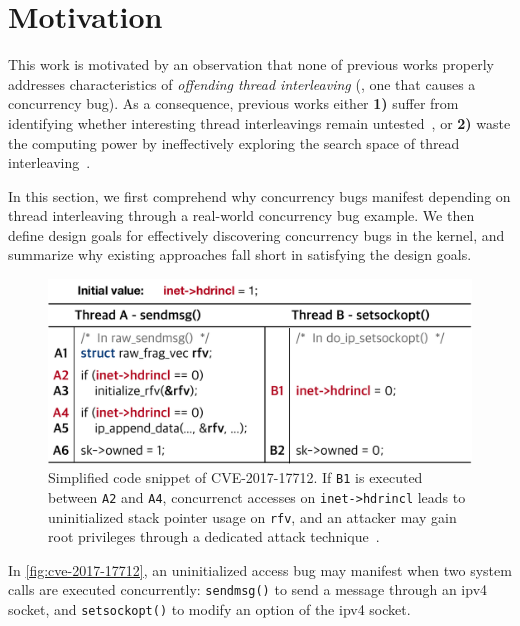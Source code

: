 \section{Motivation}
\label{s:motivation}


This work is motivated by an observation that none of previous works
properly addresses characteristics of \textit{offending thread
  interleaving} (\ie, one that causes a concurrency bug).
%
As a consequence, previous works either \textbf{1)} suffer from
identifying whether interesting thread interleavings remain
untested~\cite{krace, conzzer, muzz}, or \textbf{2)} waste the
computing power by ineffectively exploring the search space of thread
interleaving~\cite{snowboard, razzer}.



In this section, we first comprehend why concurrency bugs manifest
depending on thread interleaving through a real-world concurrency bug
example.
%
We then define design goals for effectively discovering concurrency
bugs in the kernel, and summarize why existing approaches fall short
in satisfying the design goals.


%
\begin{figure}[t]
  \centering
  \includegraphics[width=0.9\linewidth]{fig/cve-2017-10661.pdf}
  \caption{Simplified code snippet of CVE-2017-17712. If \texttt{B1}
    is executed between \texttt{A2} and \texttt{A4}, concurrenct
    accesses on \texttt{inet->hdrincl} leads to uninitialized stack
    pointer usage on \texttt{rfv}, and an attacker may gain root
    privileges through a dedicated attack
    technique~\cite{stackspray}.}
  \label{fig:cve-2017-17712}
\end{figure}
%
In \autoref{fig:cve-2017-17712}, an uninitialized access bug may
manifest when two system calls are executed concurrently:
\texttt{sendmsg()} to send a message through an ipv4 socket, and
\texttt{setsockopt()} to modify an option of the ipv4 socket.

